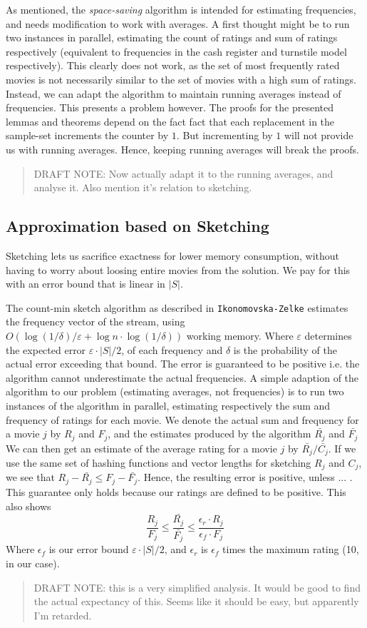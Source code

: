 As mentioned, the \textit{space-saving} algorithm is intended for
estimating frequencies, and needs modification to work with averages. A first
thought might be to run two instances in parallel, estimating the count of
ratings and sum of ratings respectively (equivalent to frequencies in the cash
register and turnstile model respectively). This clearly does not work, as the
set of most frequently rated movies is not necessarily similar to the set of
movies with a high sum of ratings. Instead, we can adapt the algorithm to
maintain running averages instead of frequencies. This presents a problem
however. The proofs for the presented lemmas and theorems depend on the fact
fact that each replacement in the sample-set increments the counter by $1$. But
incrementing by $1$ will not provide us with running averages. Hence, keeping
running averages will break the proofs. 

\begin{quote}
	DRAFT NOTE: Now actually adapt it
	to the running averages, and analyse it.
	Also mention it's relation to sketching.
\end{quote}

\subsection{Approximation based on Sketching}
\label{sec:sketching}

Sketching lets us sacrifice exactness for lower memory consumption, without
having to worry about loosing entire movies from the solution. We pay for this
with an error bound that is linear in $|S|$.

The count-min sketch algorithm as described in \texttt{Ikonomovska\--Zelke}
estimates the frequency vector of the stream, using
$O(\log(1/\delta)/\varepsilon + \log n \cdot \log(1/\delta))$ working memory.
Where $\varepsilon$ determines the expected error $\varepsilon \cdot |S| /2$, of
each frequency and $\delta$ is the probability of the actual error exceeding
that bound. The error is guaranteed to be positive i.e. the algorithm cannot
underestimate the actual frequencies. A simple adaption of the algorithm to our
problem (estimating averages, not frequencies) is to run two instances of the
algorithm in parallel, estimating respectively the sum and frequency of ratings
for each movie. We denote the actual sum and frequency for a movie $j$ by $R_j$
and $F_j$, and the estimates produced by the algorithm $\bar{R_j}$ and
$\bar{F_j}$ We can then get an estimate of the average rating for a movie $j$ by
$\bar{R_j}/\bar{C_j}$.
If we use the same set of hashing functions and
vector lengths for sketching $R_j$ and $C_j$, we see that
$R_j-\bar{R_j} \le F_j-\bar{F_j}$. Hence, the resulting error is
positive, unless ... . This guarantee only holds because our ratings are
defined to be positive. This also shows
$$\frac{R_j}{F_j} \le \frac{\bar{R_j}}{\bar{F_j}} \le \frac{\epsilon_r \cdot
R_j}{\epsilon_f \cdot F_j}$$
Where $\epsilon_f$ is our error bound $\varepsilon \cdot |S|/2$, and
$\epsilon_r$ is $\epsilon_f$ times the maximum rating (10, in our case).

\begin{quote}
	DRAFT NOTE: this is a very simplified analysis.
	It would be good to find the actual expectancy of this. Seems like it
	should be easy, but apparently I'm retarded.
\end{quote}
